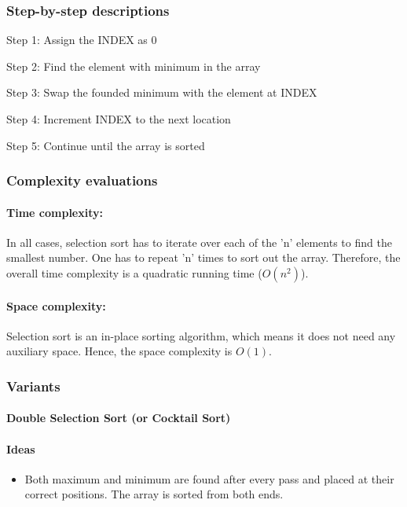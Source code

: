 \documentclass{article}
\newcommand\tab[1][0.5cm]{\hspace*{#1}}
\begin{document}
\subsubsection{Step-by-step descriptions}

\tab Step 1: Assign the INDEX as 0
\smallskip

Step 2: Find the element with minimum in the array
\smallskip

Step 3: Swap the founded minimum with the element at INDEX
\smallskip

Step 4: Increment INDEX to the next location
\smallskip

Step 5: Continue until the array is sorted

\subsubsection{Complexity evaluations}

\paragraph{\tab Time complexity:}
In all cases, selection sort has to iterate over each of the 'n' elements to find the smallest number. One has to repeat 'n' times to sort out the array. Therefore, the overall time complexity is a quadratic running time ($O(n^2)$).

\paragraph{\tab Space complexity:}
Selection sort is an in-place sorting algorithm, which means it does not need any auxiliary space. Hence, the space complexity is $O(1)$.

\subsubsection{Variants}

\paragraph{Double Selection Sort (or Cocktail Sort)}

\paragraph{\tab Ideas}

\begin{itemize}

\item Both maximum and minimum are found after every pass and placed at their correct positions. The array is sorted from both ends.

\end{itemize}
\end{document}

